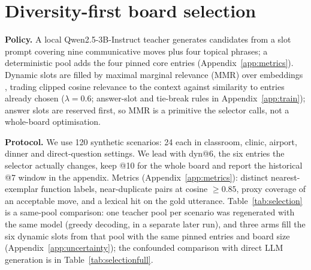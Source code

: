\section{Diversity-first board selection}\label{sec:slate}
\textbf{Policy.} A local Qwen2.5-3B-Instruct teacher generates candidates from a slot prompt covering nine communicative moves plus four topical phrases; a deterministic pool adds the four pinned core entries (Appendix~\ref{app:metrics}). Dynamic slots are filled by maximal marginal relevance (MMR) \citep{mmr1998} over  embeddings \citep{minilm}, trading clipped cosine relevance to the context against similarity to entries already chosen ($\lambda=0.6$; answer-slot and tie-break rules in Appendix~\ref{app:train}); answer slots are reserved first, so MMR is a primitive the selector calls, not a whole-board optimisation.

\textbf{Protocol.} We use 120 synthetic scenarios: 24 each in classroom, clinic, airport, dinner and direct-question settings. We lead with dyn@6, the six entries the selector actually changes, keep @10 for the whole board and report the historical @7 window in the appendix. %
Metrics (Appendix~\ref{app:metrics}): distinct nearest-exemplar function labels, near-duplicate pairs at cosine $\geq0.85$, proxy coverage of an acceptable move, and a lexical hit on the gold utterance. Table~\ref{tab:selection} is a same-pool comparison: one teacher pool per scenario was regenerated with the same model (greedy decoding, in a separate later run), and three arms fill the six dynamic slots from that pool with the same pinned entries and board size (Appendix~\ref{app:uncertainty}); the confounded comparison with direct LLM generation is in Table~\ref{tab:selectionfull}.

